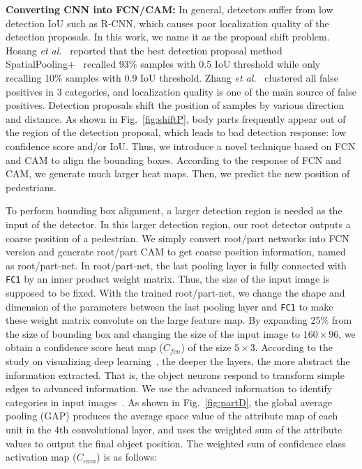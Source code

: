 \documentclass[journal]{IEEEtran}
\begin{document}
\textbf{Converting CNN into FCN/CAM:} In general, detectors suffer from low detection IoU such as R-CNN, which causes poor localization quality of the detection proposals. In this work, we name it as the proposal shift problem. Hosang \emph{et al.}~\cite{hosang2015taking} reported that the best detection proposal method SpatialPooling+~\cite{paisitkriangkrai2016pedestrian} recalled 93\% samples with 0.5 IoU threshold while only recalling 10\% samples with 0.9 IoU threshold. Zhang \emph{et al.}~\cite{Shanshan2016CVPR} clustered all false positives in 3 categories, and localization quality is one of the main source of false positives. Detection proposals shift the position of samples by various direction and distance. As shown in Fig.~\ref{fig:shiftP}, body parts frequently appear out of the region of the detection proposal, which leads to bad detection response: low confidence score and/or IoU. Thus, we introduce a novel technique based on FCN and CAM to align the bounding boxes. According to the response of FCN and CAM, we generate much larger heat maps. Then, we predict the new position of pedestrians.

To perform bounding box alignment, a larger detection region is needed as the input of the detector. In this larger detection region, our root detector outputs a coarse position of a pedestrian. We simply convert root/part networks into FCN version and generate root/part CAM to get coarse position information, named as root/part-net. In root/part-net, the last pooling layer is fully  connected with \verb"FC1" by an inner product weight matrix. Thus, the size of the input image is supposed to be fixed. With the trained root/part-net, we change the shape and dimension of the parameters between the last pooling layer and \verb"FC1" to make these weight matrix convolute on the large feature map. By expanding 25\% from the size of bounding box and changing the size of the input image to $160 \times 96$, we obtain a confidence score heat map ($C_{fcn}$) of the size  $5 \times 3$.  According to the study on visualizing deep learning~\cite{ZeilerF13Vis1, MahendranV14Vis2}, the deeper the layers, the more abstract the information extracted. That is, the object neurons respond to transform simple edges to advanced information. We use the advanced information to identify categories in input images~\cite{zhou2016learning}. As shown in Fig.~\ref{fig:partD}, the global average pooling (GAP) produces the average space value of the attribute map of each unit in the 4th convolutional layer, and uses the weighted sum of the attribute values to output the final object position. The weighted sum of confidence class activation map ($C_{cam}$) is as follows:
\end{document}
